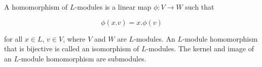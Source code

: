 A homomorphism of $L$-modules is a linear map $\phi: V \to W$ such that

$$\phi(x.v) = x.\phi(v)$$

for all $x \in L$, $v \in V$, where $V$ and $W$ are $L$-modules. An $L$-module homomorphism that is bijective is called an isomorphism of $L$-modules. The kernel and image of an $L$-module homomorphism are submodules.
